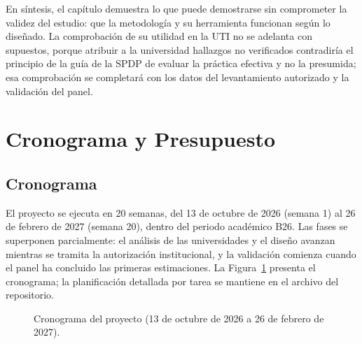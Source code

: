 En síntesis, el capítulo demuestra lo que puede demostrarse sin comprometer la validez del estudio: que la metodología y su herramienta funcionan según lo diseñado. La comprobación de su utilidad en la UTI no se adelanta con supuestos, porque atribuir a la universidad hallazgos no verificados contradiría el principio de la guía de la SPDP de evaluar la práctica efectiva y no la presumida; esa comprobación se completará con los datos del levantamiento autorizado y la validación del panel.

\section{Cronograma y Presupuesto}

\subsection{Cronograma}

El proyecto se ejecuta en 20 semanas, del 13 de octubre de 2026 (semana 1) al 26 de febrero de 2027 (semana 20), dentro del periodo académico B26. Las fases se superponen parcialmente: el análisis de las universidades y el diseño avanzan mientras se tramita la autorización institucional, y la validación comienza cuando el panel ha concluido las primeras estimaciones. La Figura~\ref{fig:cronograma} presenta el cronograma; la planificación detallada por tarea se mantiene en el archivo  del repositorio.

\begin{figure}[htbp]
  \centering
  \caption{Cronograma del proyecto (13 de octubre de 2026 a 26 de febrero de 2027).}
  \label{fig:cronograma}
  \raggedright
\end{figure}

